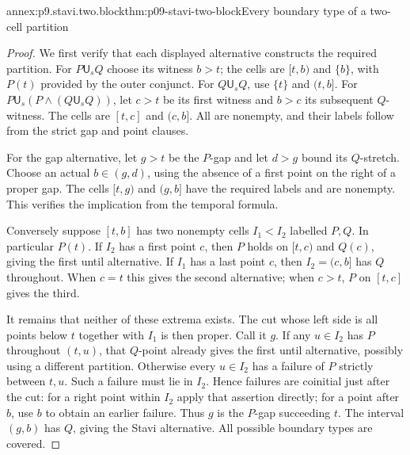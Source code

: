 \begin{annexitem}{annex:p9.stavi.two.block}{thm:p09-stavi-two-block}{Every boundary type of a two-cell partition}
\begin{proof}
We first verify that each displayed alternative
constructs the required partition.
For \(P\mathbin{\mathsf U_s}Q\) choose
its witness \(b>t\); the cells are
\([t,b)\) and \(\{b\}\), with \(P(t)\)
provided by the outer conjunct.
For \(Q\mathbin{\mathsf U_s}Q\), use
\(\{t\}\) and \((t,b]\).
For
\(P\mathbin{\mathsf U_s}(P\land(Q\mathbin{\mathsf U_s}Q))\),
let \(c>t\) be its first witness and
\(b>c\) its subsequent \(Q\)-witness.
The cells are \([t,c]\) and \((c,b]\).
All are nonempty, and their labels
follow from the strict gap and point
clauses.

For the gap alternative, let \(g>t\)
be the \(P\)-gap and let \(d>g\)
bound its \(Q\)-stretch. Choose
an actual \(b\in(g,d)\), using
the absence of a first point
on the right of a proper gap.
The cells \([t,g)\) and
\((g,b]\) have the required
labels and are nonempty.
This verifies the implication
from the temporal formula.

Conversely suppose \([t,b]\)
has two nonempty cells
\(I_1<I_2\) labelled \(P,Q\).
In particular \(P(t)\).
If \(I_2\) has a first
point \(c\), then \(P\)
holds on \([t,c)\) and
\(Q(c)\), giving the first
until alternative.
If \(I_1\) has a last
point \(c\), then \(I_2=(c,b]\)
has \(Q\) throughout.
When \(c=t\) this gives
the second alternative;
when \(c>t\), \(P\)
on \([t,c]\) gives
the third.

It remains that neither
of these extrema exists.
The cut whose left side
is all points below \(t\)
together with \(I_1\)
is then proper. Call it
\(g\). If any \(u\in I_2\)
has \(P\) throughout
\((t,u)\), that \(Q\)-point
already gives the first
until alternative, possibly
using a different partition.
Otherwise every \(u\in I_2\)
has a failure of \(P\)
strictly between \(t,u\).
Such a failure must lie
in \(I_2\). Hence failures
are coinitial just after
the cut: for a right
point within \(I_2\)
apply that assertion
directly; for a point
after \(b\), use \(b\)
to obtain an earlier
failure. Thus \(g\)
is the \(P\)-gap
succeeding \(t\).
The interval \((g,b)\)
has \(Q\), giving the
Stavi alternative.
All possible boundary
types are covered.
\end{proof}
\end{annexitem}

